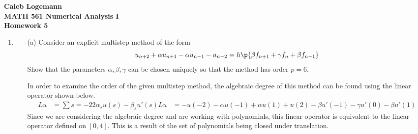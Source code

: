 \documentclass[11pt]{article}
\begin{document}
\noindent \textbf{\Large{Caleb Logemann \\
MATH 561 Numerical Analysis I \\
Homework 5
}}

\begin{enumerate}
    \item %
        \begin{enumerate}
            \item[(a)]
                Consider an explicit multistep method of the form
                \[
                    u_{n+2} + \alpha u_{n+1} - \alpha u_{n-1} - u_{n-2} =
                    h\p{\beta f_{n+1} + \gamma f_n + \beta f_{n-1}}
                \]
                Show that the parameters $\alpha, \beta, \gamma$ can be
                chosen uniquely so that the method has order $p = 6$.


                In order to examine the order of the given multistep method, the
                algebraic degree of this method can be found using the linear
                operator shown below.
                \begin{align*}
                    Lu &= \sum{s = -2}{2}{\alpha_s u(s) - \beta_s u'(s)}
                    Lu &= -u(-2) - \alpha u(-1) + \alpha u(1) + u(2) - \beta u'(-1) - \gamma u'(0) - \beta u'(1)
                \end{align*}
                Since we are considering the algebraic degree and are working
                with polynomials, this linear operator is equivalent to the
                linear operator defined on $[0, 4]$.
                This is a result of the set of polynomials being closed under
                translation.
                

\end{enumerate}
\end{enumerate}
\end{document}
